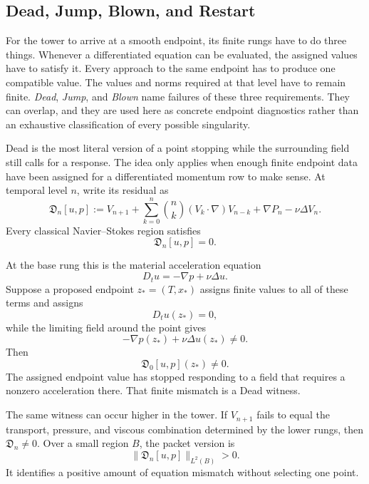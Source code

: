 \subsection{Dead, Jump, Blown, and Restart}\label{sub:DeadJumpBlownAndRestart}

For the tower to arrive at a smooth endpoint, its finite rungs have to do three things.
Whenever a differentiated equation can be evaluated, the assigned values have to satisfy it.
Every approach to the same endpoint has to produce one compatible value.
The values and norms required at that level have to remain finite.
\emph{Dead}, \emph{Jump}, and \emph{Blown} name failures of these three requirements.
They can overlap, and they are used here as concrete endpoint diagnostics rather than an exhaustive classification of every possible singularity.


Dead is the most literal version of a point stopping while the surrounding field still calls for a response.
The idea only applies when enough finite endpoint data have been assigned for a differentiated momentum row to make sense.
At temporal level \(n\), write its residual as
\[
  \mathfrak D_n[u,p]
  :=
  V_{n+1}
  +
  \sum_{k=0}^{n}
  \binom{n}{k}
  (V_k\cdot\nabla)V_{n-k}
  +
  \nabla P_n
  -
  \nu\Delta V_n.
\]
Every classical Navier--Stokes region satisfies
\[
  \mathfrak D_n[u,p]=0.
\]

At the base rung this is the material acceleration equation
\[
  D_tu=-\nabla p+\nu\Delta u.
\]
Suppose a proposed endpoint \(z_*=(T,x_*)\) assigns finite values to all of these terms and assigns
\[
  D_tu(z_*)=0,
\]
while the limiting field around the point gives
\[
  -\nabla p(z_*)+\nu\Delta u(z_*)\neq0.
\]
Then
\[
  \mathfrak D_0[u,p](z_*)\neq0.
\]
The assigned endpoint value has stopped responding to a field that requires a nonzero acceleration there.
That finite mismatch is a Dead witness.

The same witness can occur higher in the tower.
If \(V_{n+1}\) fails to equal the transport, pressure, and viscous combination determined by the lower rungs, then \(\mathfrak D_n\neq0\).
Over a small region \(B\), the packet version is
\[
  \|\mathfrak D_n[u,p]\|_{L^2(B)}>0.
\]
It identifies a positive amount of equation mismatch without selecting one point.

